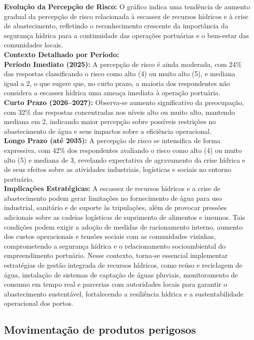 \documentclass[
  portuguese,
  letterpaper,
  DIV=11,
  numbers=noendperiod]{scrreprt}
\begin{document}
\begin{tcolorbox}
\textbf{Evolução da Percepção de Risco:} O gráfico indica uma tendência
de aumento gradual da percepção de risco relacionada à escassez de
recursos hídricos e à crise de abastecimento, refletindo o
reconhecimento crescente da importância da segurança hídrica para a
continuidade das operações portuárias e o bem-estar das comunidades
locais. \textbar{}\\
\textbf{Contexto Detalhado por Período:} \textbar{}\\
\textbf{Período Imediato (2025):} A percepção de risco é ainda moderada,
com 24\% das respostas classificando o risco como alto (4) ou muito alto
(5), e mediana igual a 2, o que sugere que, no curto prazo, a maioria
dos respondentes não considera a escassez hídrica uma ameaça imediata à
operação portuária. \textbar{}\\
\textbf{Curto Prazo (2026--2027):} Observa-se aumento significativo da
preocupação, com 32\% das respostas concentradas nos níveis alto ou
muito alto, mantendo mediana em 2, indicando maior percepção sobre
possíveis restrições no abastecimento de água e seus impactos sobre a
eficiência operacional. \textbar{}\\
\textbf{Longo Prazo (até 2035):} A percepção de risco se intensifica de
forma expressiva, com 42\% dos respondentes avaliando o risco como alto
(4) ou muito alto (5) e mediana de 3, revelando expectativa de
agravamento da crise hídrica e de seus efeitos sobre as atividades
industriais, logísticas e sociais no entorno portuário. \textbar{}\\
\textbf{Implicações Estratégicas:} A escassez de recursos hídricos e a
crise de abastecimento podem gerar limitações no fornecimento de água
para uso industrial, sanitário e de suporte às tripulações, além de
provocar pressões adicionais sobre as cadeias logísticas de suprimento
de alimentos e insumos. Tais condições podem exigir a adoção de medidas
de racionamento interno, aumento dos custos operacionais e tensões
sociais com as comunidades vizinhas, comprometendo a segurança hídrica e
o relacionamento socioambiental do empreendimento portuário. Nesse
contexto, torna-se essencial implementar estratégias de gestão integrada
de recursos hídricos, como reúso e reciclagem de água, instalação de
sistemas de captação de águas pluviais, monitoramento de consumo em
tempo real e parcerias com autoridades locais para garantir o
abastecimento sustentável, fortalecendo a resiliência hídrica e a
sustentabilidade operacional dos portos. \textbar{}

\subsection{Movimentação de produtos
perigosos}\label{movimentauxe7uxe3o-de-produtos-perigosos}

\end{tcolorbox}
\end{document}
